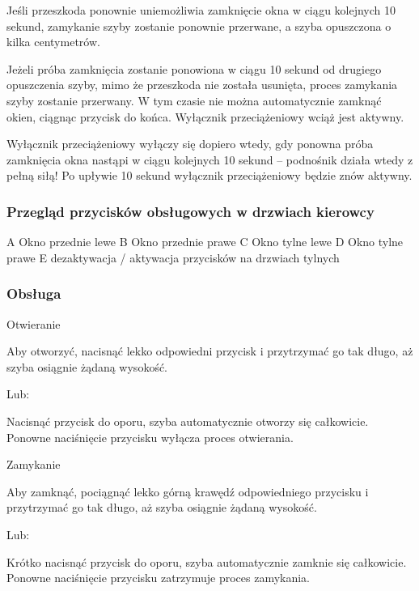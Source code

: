 Jeśli przeszkoda ponownie uniemożliwia zamknięcie okna w ciągu kolejnych 10 sekund, zamykanie szyby zostanie ponownie przerwane, a szyba opuszczona o kilka centymetrów.

Jeżeli próba zamknięcia zostanie ponowiona w ciągu 10 sekund od drugiego opuszczenia szyby, mimo że przeszkoda nie została usunięta, proces zamykania szyby zostanie przerwany. W tym czasie nie można automatycznie zamknąć okien, ciągnąc przycisk do końca. Wyłącznik przeciążeniowy wciąż jest aktywny.

Wyłącznik przeciążeniowy wyłączy się dopiero wtedy, gdy ponowna próba zamknięcia okna nastąpi w ciągu kolejnych 10 sekund – podnośnik działa wtedy z pełną siłą! Po upływie 10 sekund wyłącznik przeciążeniowy będzie znów aktywny.

\subsubsection{Przegląd przycisków obsługowych w drzwiach kierowcy}


A Okno przednie lewe
B Okno przednie prawe
C Okno tylne lewe
D Okno tylne prawe
E dezaktywacja / aktywacja przycisków na drzwiach tylnych

\subsubsection{Obsługa}

Otwieranie

\begin{itemizeArrow}
	\itemArrow Aby otworzyć, nacisnąć lekko odpowiedni przycisk i przytrzymać go tak długo, aż szyba osiągnie żądaną wysokość.
\end{itemizeArrow}
Lub:
\begin{itemizeArrow}
	\itemArrow Nacisnąć przycisk do oporu, szyba automatycznie otworzy się całkowicie. Ponowne naciśnięcie przycisku wyłącza proces otwierania.
\end{itemizeArrow}

Zamykanie

\begin{itemizeArrow}
	\itemArrow Aby zamknąć, pociągnąć lekko górną krawędź odpowiedniego przycisku i przytrzymać go tak długo, aż szyba osiągnie żądaną wysokość.
\end{itemizeArrow}
Lub:
\begin{itemizeArrow}
	\itemArrow Krótko nacisnąć przycisk do oporu, szyba automatycznie zamknie się całkowicie. Ponowne naciśnięcie przycisku zatrzymuje proces zamykania.
\end{itemizeArrow}

